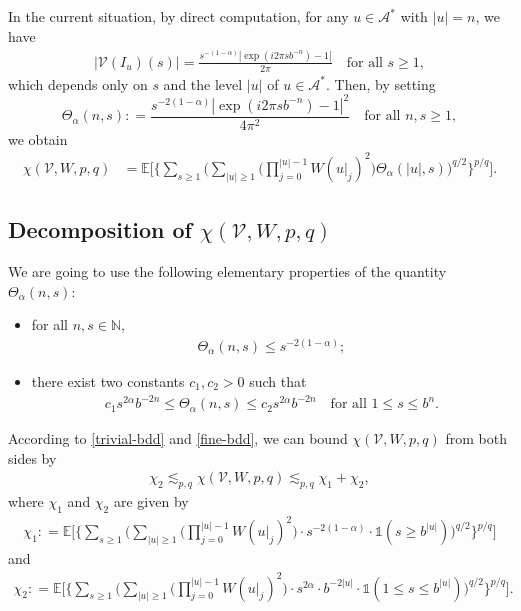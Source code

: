 \documentclass[12pt]{amsart}
\theoremstyle{definition}
\theoremstyle{remark}
\newcommand{\N}{\mathbb{N}}
\newcommand{\E}{\mathbb{E}}
\newcommand{\Ab}{\mathcal{A}}
\newcommand{\indi}{\mathds{1}}
\numberwithin{equation}{section}
\begin{document}
In the current situation, by direct computation,  for any $u\in \Ab^*$ with $|u| = n$, we have 
\begin{align}\label{V-exp}
\big| \mathcal{V}(I_u)(s)  \big| = \frac{s^{-(1-\alpha)}|  \exp(i  2\pi s b^{-n}) -1|}{2\pi} \quad \text{for all $s\ge 1$},
\end{align}
which depends only on $s$ and  the level $|u|$ of $u\in \Ab^*$.  
Then, by setting
\[
\Theta_\alpha(n, s):  =\frac{s^{-2(1-\alpha)} |  \exp(i  2\pi s b^{-n}) -1|^2}{4\pi^2} \quad \text{for all $n, s \ge 1$}, 
\]
we obtain 
\begin{align*}
\chi(\mathcal{V}, W, p, q)  &  = \E \Big[   \Big\{    \sum_{s \ge 1}       \Big(   \sum_{|u|\ge 1}    \Big(  \prod_{j=0}^{|u|-1} W(u|_j)^2 \Big)    \Theta_\alpha(|u|, s)    \Big)^{q/2}  \Big\}^{p/q}\Big]. 
\end{align*}
 
 
\subsection{Decomposition of $\chi(\mathcal{V}, W, p,q)$}
We are going to use the following elementary properties of the quantity $\Theta_\alpha(n,s)$: 
\begin{itemize}
\item for all $n, s \in \N$, 
\begin{align}\label{trivial-bdd}
  \Theta_\alpha(n, s)\le  s^{-2(1-\alpha)};
\end{align}
\item  there exist two constants $c_1, c_2>0$ such that 
\begin{align}\label{fine-bdd}
c_1  s^{2\alpha} b^{-2n}  \le \Theta_\alpha(n, s) \le  c_2   s^{2\alpha} b^{-2n} \quad \text{for all $1\le s\le b^n$}.
\end{align}
\end{itemize}
According to \eqref{trivial-bdd} and \eqref{fine-bdd},  we can bound $\chi(\mathcal{V}, W, p, q)$ from both sides by 
\begin{align}\label{chi-2-12}
\chi_2\lesssim_{p,q}  \chi(\mathcal{V}, W, p, q)   \lesssim_{p,q} \chi_1 + \chi_2,
\end{align}
where $\chi_1$ and $\chi_2$ are given by 
\begin{align}\label{def-chi-I}
\chi_1 : =  \E \Big[   \Big\{     \sum_{s \ge 1}       \Big(   \sum_{|u|\ge 1}    \Big(  \prod_{j=0}^{|u|-1} W(u|_j)^2 \Big)   \cdot    s^{-2 (1-\alpha)} \cdot  \indi (s \ge  b^{|u|}) \Big)^{q/2}  \Big\}^{p/q}\Big]
\end{align}
and 
\begin{align}\label{def-chi-II}
\chi_2: = \E \Big[   \Big\{     \sum_{s \ge 1}       \Big(   \sum_{|u|\ge 1}    \Big(  \prod_{j=0}^{|u|-1} W(u|_j)^2 \Big)   \cdot    s^{2 \alpha} \cdot   b^{-2|u|}  \cdot \indi(1\le s\le b^{|u|})  \Big)^{q/2}  \Big\}^{p/q}\Big].
\end{align}
\end{document}
